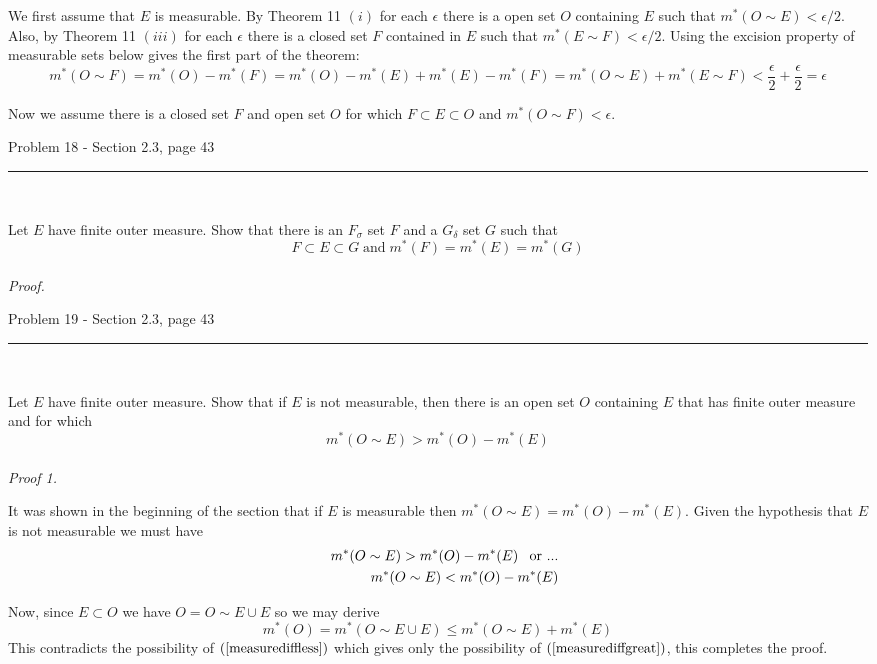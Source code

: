 \documentclass[11pt,reqno]{article}
\begin{document}
We first assume that $E$ is measurable. By Theorem 11 $(i)$ for each $\epsilon$ there is a open set $O$ containing $E$ such that $m^*(O \sim E) < \epsilon / 2$. Also, by Theorem 11 $(iii)$ for each $\epsilon$ there is a closed set $F$ contained in $E$ such that $m^*(E \sim F) < \epsilon / 2$. Using the excision property of measurable sets below gives the first part of the theorem:
\[ m^*(O \sim F) = m^*(O) - m^*(F) =  m^*(O) - m^*(E) + m^*(E) - m^*(F)  =  m^*(O \sim E) + m^*(E \sim F) < \frac{\epsilon}{2} + \frac{\epsilon}{2} = \epsilon  \]

Now we assume there is a closed set $F$ and open set $O$ for which $F \subset E \subset O$  and $m^*(O \sim F) < \epsilon$.

\begin{flushleft} 
Problem 18 - Section 2.3, page 43\\
\rule{500pt}{1pt}\\
\end{flushleft} 

Let $E$ have finite outer measure. Show that there is an $F_\sigma$ set $F$ and a $G_\delta$ set $G$ such that 
\[ F \subset E \subset G \; \text{and} \; m^*(F) = m^*(E) = m^*(G) \]
\\ \emph{Proof.}

\begin{flushleft} 
Problem 19 - Section 2.3, page 43\\
\rule{500pt}{1pt}\\
\end{flushleft} 

Let $E$ have finite outer measure. Show that if $E$ is not measurable, then there is an open set $O$ containing $E$ that has finite outer measure and for which 
\[ m^*(O \sim E) > m^*(O) - m^*(E) \]
\\ \emph{Proof 1.}

It was shown in the beginning of the section that if $E$ is measurable then $m^*(O \sim E) = m^*(O) - m^*(E)$. Given the hypothesis that $E$ is not measurable we must have
\begin{eqnarray}
&&m^*(O \sim E) > m^*(O) - m^*(E) \hspace{8px} \text{or ...} \label{measurediffgreat}\\
&&m^*(O \sim E) < m^*(O) - m^*(E) \label{measurediffless}
\end{eqnarray}

Now, since $E \subset O$ we have $O = O \sim E \cup E$ so we may derive 
\[ m^*(O) =  m^*(O \sim E \cup E) \le m^*(O \sim E) + m^*(E)  \]
This contradicts the possibility of $(\ref{measurediffless})$ which gives only the possibility of $(\ref{measurediffgreat})$, this completes the proof.\\
\end{document}
